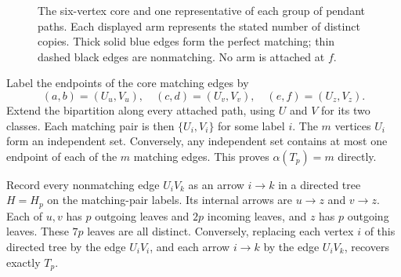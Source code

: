 \documentclass[11pt,a4paper]{article}
\theoremstyle{remark}
\numberwithin{equation}{section}
\begin{document}
\begin{figure}[ht]
\centering
{}
\caption{The six-vertex core and one representative of each group of
pendant paths. Each displayed arm represents the stated number of
distinct copies. Thick solid blue edges form the perfect matching;
thin dashed black edges are nonmatching. No arm is attached at $f$.}
\label{fig:core}
\end{figure}

Label the endpoints of the core matching edges by
\[
 (a,b)=(U_u,V_u),\quad (c,d)=(U_v,V_v),\quad
 (e,f)=(U_z,V_z).
\]
Extend the bipartition along every attached path, using $U$ and $V$
for its two classes. Each matching pair is then $\{U_i,V_i\}$ for
some label $i$. The $m$ vertices $U_i$ form an independent set.
Conversely, any independent set contains at most one endpoint of
each of the $m$ matching edges. This proves $\alpha(T_p)=m$ directly.

Record every nonmatching edge $U_iV_k$ as an arrow $i\to k$ in a
directed tree $H=H_p$ on the matching-pair labels. Its internal arrows
are $u\to z$ and $v\to z$. Each of $u,v$ has $p$ outgoing leaves and
$2p$ incoming leaves, and $z$ has $p$ outgoing leaves. These $7p$
leaves are all distinct. Conversely, replacing each vertex $i$ of
this directed tree by the edge $U_iV_i$, and each arrow $i\to k$ by
the edge $U_iV_k$, recovers exactly $T_p$.
\end{document}
